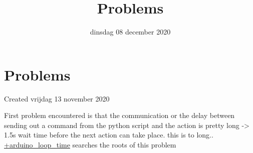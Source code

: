 \documentclass{scrartcl}
\title{Problems}
\date{dinsdag 08 december 2020}
\author{}
\begin{document}
\maketitle

		\section{Problems}

Created vrijdag 13 november 2020



First problem encountered is that the communication or the delay between sending out a command from the python script and the action is pretty long -\textgreater{} 1.5s wait time before the next action can take place. this is to long.. \href{./Problems/arduino_loop_time.tex}{+arduino\_loop\_time} searches the roots of this problem
\end{document}
